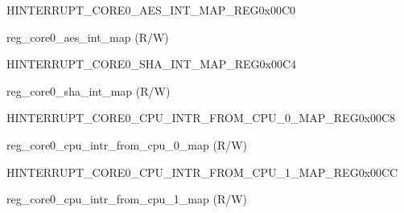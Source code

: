 \begin{register}{H}{INTERRUPT\_CORE0\_AES\_INT\_MAP\_REG}{0x00C0}\label{regdesc:INTERRUPTCORE0AESINTMAPREG}
%
%
\regnewline%
\begin{regdesc}\begin{reglist}
\label{fielddesc:INTERRUPTCORE0AESINTMAP}\item [INTERRUPT\_CORE0\_AES\_INT\_MAP] reg\_core0\_aes\_int\_map (R/W)
\end{reglist}\end{regdesc}
\end{register}


\begin{register}{H}{INTERRUPT\_CORE0\_SHA\_INT\_MAP\_REG}{0x00C4}\label{regdesc:INTERRUPTCORE0SHAINTMAPREG}
%
%
\regnewline%
\begin{regdesc}\begin{reglist}
\label{fielddesc:INTERRUPTCORE0SHAINTMAP}\item [INTERRUPT\_CORE0\_SHA\_INT\_MAP] reg\_core0\_sha\_int\_map (R/W)
\end{reglist}\end{regdesc}
\end{register}


\begin{register}{H}{INTERRUPT\_CORE0\_CPU\_INTR\_FROM\_CPU\_0\_MAP\_REG}{0x00C8}\label{regdesc:INTERRUPTCORE0CPUINTRFROMCPU0MAPREG}
%
%
\regnewline%
\begin{regdesc}\begin{reglist}
\label{fielddesc:INTERRUPTCORE0CPUINTRFROMCPU0MAP}\item [INTERRUPT\_CORE0\_CPU\_INTR\_FROM\_CPU\_0\_MAP] reg\_core0\_cpu\_intr\_from\_cpu\_0\_map (R/W)
\end{reglist}\end{regdesc}
\end{register}


\begin{register}{H}{INTERRUPT\_CORE0\_CPU\_INTR\_FROM\_CPU\_1\_MAP\_REG}{0x00CC}\label{regdesc:INTERRUPTCORE0CPUINTRFROMCPU1MAPREG}
%
%
\regnewline%
\begin{regdesc}\begin{reglist}
\label{fielddesc:INTERRUPTCORE0CPUINTRFROMCPU1MAP}\item [INTERRUPT\_CORE0\_CPU\_INTR\_FROM\_CPU\_1\_MAP] reg\_core0\_cpu\_intr\_from\_cpu\_1\_map (R/W)
\end{reglist}\end{regdesc}
\end{register}


